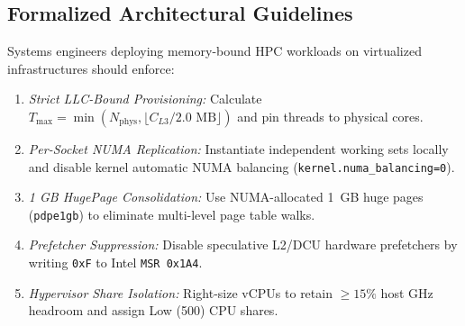 \documentclass[journal]{IEEEtran}
\begin{document}
\subsection{Formalized Architectural Guidelines}
Systems engineers deploying memory-bound HPC workloads on virtualized infrastructures should enforce:
\begin{enumerate}
\item \textit{Strict LLC-Bound Provisioning:} Calculate $T_{\max} = \min(N_{\text{phys}}, \lfloor C_{L3}/2.0\text{ MB} \rfloor)$ and pin threads to physical cores.
\item \textit{Per-Socket NUMA Replication:} Instantiate independent working sets locally and disable kernel automatic NUMA balancing (\texttt{kernel.numa\_balancing=0}).
\item \textit{1 GB HugePage Consolidation:} Use NUMA-allocated 1~GB huge pages (\texttt{pdpe1gb}) to eliminate multi-level page table walks.
\item \textit{Prefetcher Suppression:} Disable speculative L2/DCU hardware prefetchers by writing \texttt{0xF} to Intel \texttt{MSR 0x1A4}.
\item \textit{Hypervisor Share Isolation:} Right-size vCPUs to retain $\ge 15\%$ host GHz headroom and assign Low (500) CPU shares.
\end{enumerate}



\end{document}
